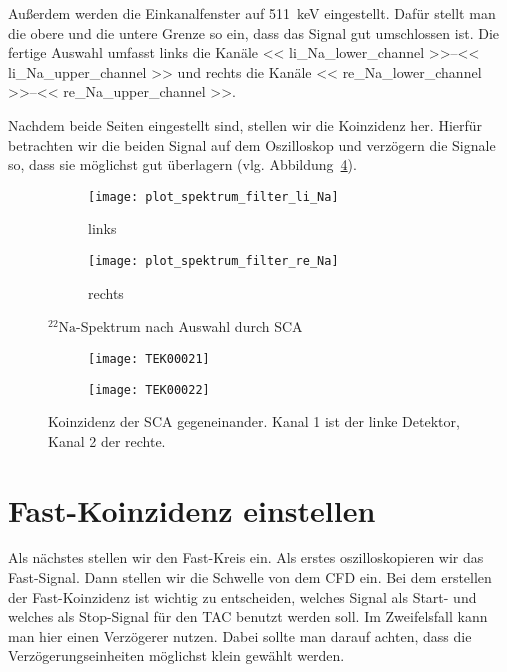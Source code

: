 \documentclass[11pt, ngerman, fleqn, DIV=15, headinclude, BCOR=2cm]{scrreprt}
\begin{document}
Außerdem werden die Einkanalfenster auf \SI{511}{\kilo\electronvolt}
eingestellt. Dafür stellt man die obere und die untere Grenze so ein, dass das
Signal gut umschlossen ist. 
Die fertige Auswahl umfasst links die Kanäle
\numrange{<< li_Na_lower_channel >>}{<< li_Na_upper_channel >>} und rechts
die Kanäle
\numrange{<< re_Na_lower_channel >>}{<< re_Na_upper_channel >>}.

Nachdem beide Seiten eingestellt sind, stellen
wir die Koinzidenz her. Hierfür betrachten wir die beiden Signal auf dem
Oszilloskop und verzögern die Signale so, dass sie möglichst gut überlagern
(vlg. Abbildung~\ref{fig:slow_signal_sca_koinzidenz}).

\begin{figure}[htbp]
	\centering
	\begin{subfigure}{0.49 \textwidth}
		\texttt{[image: plot\_spektrum\_filter\_li\_Na]}
		\caption{%
			links
		}
		\label{fig:slow_sca_eingestellt-li_plot}
	\end{subfigure}
	\begin{subfigure}{0.49 \textwidth}
		\texttt{[image: plot\_spektrum\_filter\_re\_Na]}
		\caption{%
			rechts
		}
		\label{fig:slow_sca_eingestellt-re_plot}
	\end{subfigure}
	\caption{%
		$^{22}\text{Na}$-Spektrum nach Auswahl durch SCA
	}
	\label{fig:slow_signal_sca_eingestellt_plot}
\end{figure}

\begin{figure}[htbp]
	\centering
	\begin{subfigure}{0.49 \textwidth}
		\texttt{[image: TEK00021]}
	\end{subfigure}
	\begin{subfigure}{0.49 \textwidth}
		\texttt{[image: TEK00022]}
	\end{subfigure}
	\caption{%
		Koinzidenz der SCA gegeneinander. Kanal 1 ist der linke
		Detektor, Kanal 2 der rechte.
	}
	\label{fig:slow_signal_sca_koinzidenz}
\end{figure}

\clearpage

\section{Fast-Koinzidenz einstellen}
Als nächstes stellen wir den Fast-Kreis ein. Als erstes oszilloskopieren wir
das Fast-Signal. Dann stellen wir die Schwelle von dem CFD ein.
Bei dem erstellen der Fast-Koinzidenz ist wichtig zu entscheiden, welches
Signal als Start- und welches als Stop-Signal für den TAC benutzt werden soll.
Im Zweifelsfall kann man hier einen Verzögerer nutzen. Dabei sollte man darauf
achten, dass die Verzögerungseinheiten möglichst klein gewählt werden.
\end{document}

